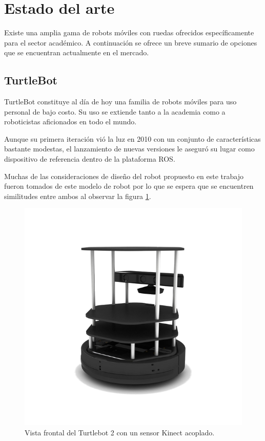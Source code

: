 \newpage

\section{Estado del arte}

Existe una amplia gama de robots móviles con ruedas ofrecidos específicamente para el sector académico. A continuación se ofrece un breve sumario de opciones que se encuentran actualmente en el mercado.

\subsection{TurtleBot}\label{sec:turtlebot}

TurtleBot constituye al día de hoy una familia de robots móviles para uso personal de bajo costo. Su uso se extiende tanto a la academia como a roboticistas aficionados en todo el mundo.

Aunque su primera iteración vió la luz en 2010 con un conjunto de características bastante modestas, el lanzamiento de nuevas versiones le aseguró su lugar como dispositivo de referencia dentro de la plataforma ROS.

Muchas de las consideraciones de diseño del robot propuesto en este trabajo fueron tomados de este modelo de robot por lo que se espera que se encuentren similitudes entre ambos al observar la figura \ref{fig:robotTurtlebot}.

\begin{figure}[ht]
	\centering
	\includegraphics[scale=1.5]{./Figures/turtlebot.png}
	\caption{Vista frontal del Turtlebot 2 con un sensor Kinect acoplado.\protect\footnotemark}
	\label{fig:robotTurtlebot}
\end{figure}

